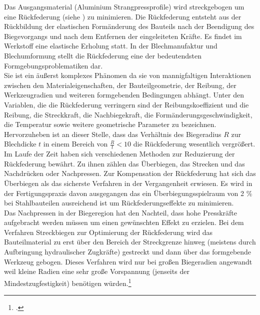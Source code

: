 \documentclass[12pt,a4paper,parskip]{scrartcl}
\begin{document}
Das Ausgangsmaterial (Aluminium Strangpressprofile) wird streckgebogen um eine Rückfederung (siehe ) zu minimieren.  Die Rückfederung entsteht aus der Rückbildung der elastischen Formänderung des Bauteils nach der Beendigung des Biegevorgangs und nach dem Entfernen der eingeleiteten Kräfte. Es findet im Werkstoff eine elastische Erholung statt. In der Blechmanufaktur und Blechumformung stellt die Rückfederung eine der bedeutendsten Formgebungsproblematiken dar.
\\
 Sie ist ein äußerst komplexes Phänomen da sie von mannigfaltigen Interaktionen zwischen den Materialeigenschaften, der Bauteilgeometrie, der Reibung,  der Werkzeugradien und weiteren formgebenden Bedingungen abhängt. Unter den Variablen, die die Rückfederung verringern sind der Reibungskoeffizient und die Reibung, die Streckkraft, die Nachbiegekraft, die Formänderungsgeschwindigkeit, die Temperatur sowie weitere geometrische Parameter zu bezeichnen. Hervorzuheben ist an dieser Stelle, dass das Verhältnis des Biegeradius $ R $ zur Blechdicke $ t $ in einem Bereich von $ \frac{R}{t} < 10 $ die Rückfederung wesentlich vergrößert. Im Laufe der Zeit haben sich verschiedenen Methoden zur Reduzierung der Rückfederung bewährt. Zu ihnen zählen das Überbiegen, das Strecken und das Nachdrücken oder Nachpressen. Zur Kompensation der Rückfederung hat sich das Überbiegen als das sicherste Verfahren in der Vergangenheit erwiesen. Es wird in der Fertigungspraxis davon ausgegangen das ein Überbiegungsspielraum von 2 \%  bei Stahlbauteilen ausreichend ist um Rückfederungseffekte zu minimieren.\\ Das Nachpressen in der Biegeregion hat den Nachteil, dass hohe Presskräfte aufgebracht werden müssen um einen gewünschten Effekt zu erzielen. Bei dem Verfahren  Streckbiegen zur Optimierung der Rückfederung wird das Bauteilmaterial zu erst über den Bereich der Streckgrenze hinweg (meistens durch Aufbringung hydraulischer Zugkräfte) gestreckt und dann über das formgebende Werkzeug gebogen. Dieses Verfahren wird nur bei großen Biegeradien angewandt weil kleine Radien eine sehr große Vorspannung (jenseits der Mindestzugfestigkeit) benötigen würden.\footcite[Vgl.][16-19]{hmp}\\  
 
\end{document}
